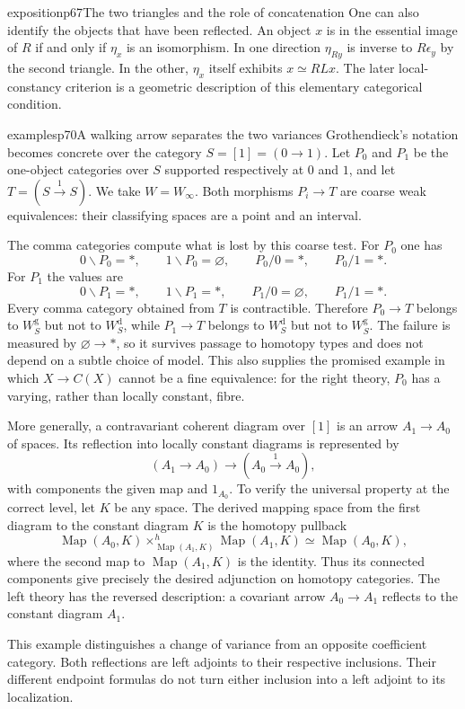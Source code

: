 \begin{dcomment}{exposition}{p67}{The two triangles and the role of concatenation}
One can also identify the objects that have been reflected. An object $x$ is in the essential image of $R$ if and only if $\eta_x$ is an isomorphism. In one direction $\eta_{Ry}$ is inverse to $R\epsilon_y$ by the second triangle. In the other, $\eta_x$ itself exhibits $x\simeq RLx$. The later local-constancy criterion is a geometric description of this elementary categorical condition.
\end{dcomment}

\begin{dcomment}{examples}{p70}{A walking arrow separates the two variances}
Grothendieck's notation becomes concrete over the category $S=[1]=(0\to1)$. Let $P_0$ and $P_1$ be the one-object categories over $S$ supported respectively at $0$ and $1$, and let $T=(S\xrightarrow{1}S)$. We take $W=W_\infty$. Both morphisms $P_i\to T$ are coarse weak equivalences: their classifying spaces are a point and an interval.

The comma categories compute what is lost by this coarse test. For $P_0$ one has
\[
 0\backslash P_0=*,\qquad 1\backslash P_0=\varnothing,
 \qquad P_0/0=*,\qquad P_0/1=*.
\]
For $P_1$ the values are
\[
 0\backslash P_1=*,\qquad1\backslash P_1=*,
 \qquad P_1/0=\varnothing,\qquad P_1/1=*.
\]
Every comma category obtained from $T$ is contractible. Therefore $P_0\to T$ belongs to $W_S^{\mathrm g}$ but not to $W_S^{\mathrm d}$, while $P_1\to T$ belongs to $W_S^{\mathrm d}$ but not to $W_S^{\mathrm g}$. The failure is measured by $\varnothing\to*$, so it survives passage to homotopy types and does not depend on a subtle choice of model. This also supplies the promised example in which $X\to C(X)$ cannot be a fine equivalence: for the right theory, $P_0$ has a varying, rather than locally constant, fibre.

More generally, a contravariant coherent diagram over $[1]$ is an arrow $A_1\to A_0$ of spaces. Its reflection into locally constant diagrams is represented by
\[
 (A_1\longrightarrow A_0)\longrightarrow(A_0\xrightarrow{1}A_0),
\]
with components the given map and $1_{A_0}$. To verify the universal property at the correct level, let $K$ be any space. The derived mapping space from the first diagram to the constant diagram $K$ is the homotopy pullback
\[
 \operatorname{Map}(A_0,K)
 \mathop{\times}^{h}_{\operatorname{Map}(A_1,K)}
 \operatorname{Map}(A_1,K)
 \simeq\operatorname{Map}(A_0,K),
\]
where the second map to $\operatorname{Map}(A_1,K)$ is the identity. Thus its connected components give precisely the desired adjunction on homotopy categories. The left theory has the reversed description: a covariant arrow $A_0\to A_1$ reflects to the constant diagram $A_1$.

This example distinguishes a change of variance from an opposite coefficient category. Both reflections are left adjoints to their respective inclusions. Their different endpoint formulas do not turn either inclusion into a left adjoint to its localization.
\end{dcomment}

